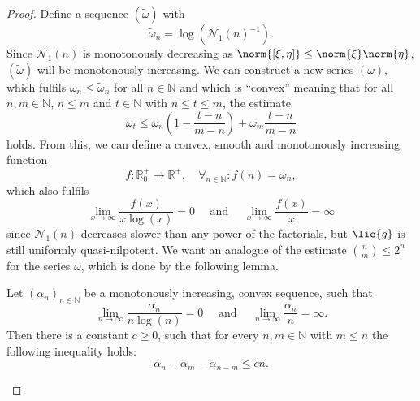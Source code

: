 \documentclass[
11pt,                          %
english                        %
]{article}
\begin{document}
\begin{proof}
	Define a sequence $(\widetilde{\omega})$ with
	\begin{equation*}
		\widetilde{\omega}_n
		=
		\log \left(
			\mathcal{N}_1(n)^{-1}
		\right).
	\end{equation*}
	Since $\mathcal{N}_1(n)$ is monotonously decreasing as $\norm{[\xi, \eta]} \leq 
	\norm{\xi} \norm{\eta}$, $(\widetilde{\omega})$ will be monotonously increasing.
	We can construct a new series $(\omega)$, which fulfils 
	$\omega_n \leq \widetilde{\omega}_n$ for all $n \in \mathbb{N}$ and which is 
	``convex'' meaning that for all $n, m \in \mathbb{N}$, 
	$n \leq m$ and $t \in \mathbb{N}$ with $n \leq t \leq m$, the estimate
	\begin{equation*}
		\omega_t 
		\leq 
		\omega_n \left( 1 - \frac{t - n}{m - n} \right) + 
		\omega_m \frac{t - n}{m - n}
	\end{equation*}
	holds. From this, we can define a convex, smooth and monotonously increasing 
	function
	\begin{equation*}
		f \colon
		\mathbb{R}_0^+
		\longrightarrow
		\mathbb{R}^+
		, \quad
		\forall_{n \in \mathbb{N}}
		\colon
		f(n) 
		=
		\omega_n,
	\end{equation*}
	which also fulfils
	\begin{equation*}
		\lim_{x \rightarrow \infty}
		\frac{f(x)}{x \log(x)}
		=
		0
		\quad \text{ and } \quad
		\lim_{x \rightarrow \infty}
		\frac{f(x)}{x}
		=
		\infty
	\end{equation*}
	since $\mathcal{N}_1(n)$ decreases slower than any power of the factorials, 
	but $\lie{g}$ is still uniformly quasi-nilpotent. We want an analogue of the 
	estimate $\binom{n}{m} \leq 2^n$ for the series $\omega$, which is done by the 
	following lemma.
	\begin{lemma}
		Let $(\alpha_n)_{n \in \mathbb{N}}$ be a monotonously increasing, convex 
		sequence, such that
		\begin{equation*}
			\lim_{n \rightarrow \infty}
			\frac{\alpha_n}{n \log(n)}
			=
			0
			\quad \text{ and } \quad
			\lim_{n \rightarrow \infty}
			\frac{\alpha_n}{n}
			=
			\infty.
		\end{equation*}
		Then there is a constant $c \geq 0$, such that for every $n,m \in 
		\mathbb{N}$ with $m \leq n$ the following inequality holds:
		\begin{equation}
		\label{Lemma:LogBinomialEstimate}
			\alpha_n - \alpha_m - \alpha_{n-m}
			\leq
			c n.
		\end{equation}

\end{lemma}
\end{proof}
\end{document}
